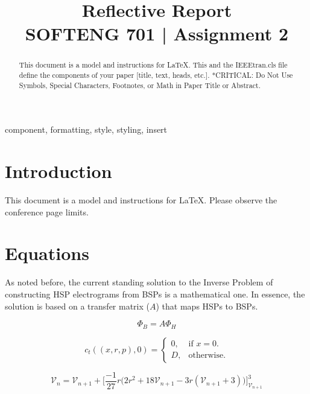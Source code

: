 \documentclass[10pt,a4paper,conference]{IEEEtran}
\newcommand{\Vc}{\mathcal{V}}
\begin{document}
\title{Reflective Report\\
{\footnotesize \textsuperscript{}SOFTENG 701 | Assignment 2}}

\author{

}

\maketitle

\begin{abstract}
This document is a model and instructions for \LaTeX.
This and the IEEEtran.cls file define the components of your paper [title, text, heads, etc.]. *CRITICAL: Do Not Use Symbols, Special Characters, Footnotes, 
or Math in Paper Title or Abstract.
\end{abstract}

\begin{IEEEkeywords}
component, formatting, style, styling, insert
\end{IEEEkeywords}

\section{Introduction}
This document is a model and instructions for \LaTeX.
Please observe the conference page limits. 

\section{Equations}
As noted before, the current standing solution to the Inverse Problem of constructing HSP electrograms from BSPs is a mathematical one. In essence, the solution is based on a transfer matrix ($A$) that maps HSPs to BSPs.

\begin{equation*}
  \Phi_B = A \Phi_H
\end{equation*}


\begin{equation}
  c_{t}((x,r,p),0)=\begin{cases}
    0, & \text{if $x=0$}.\\
    D, & \text{otherwise}.
  \end{cases}
\end{equation}

\begin{equation}
	\Vc_n = \Vc_{n+1}  +  \bigg[  \frac{-1}{27} r \big( 2r^2 + 18\Vc_{n+1} - 3r(\Vc_{n+1}+3)\big)    \bigg]_{\Vc_{n+1}}^{3}
	\end{equation}
	
\end{document}
